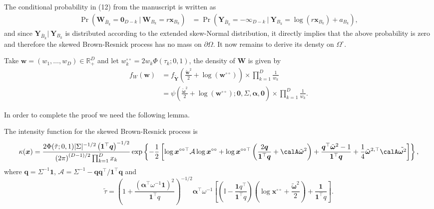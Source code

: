 \documentclass[12pt]{article}
\begin{document}
The conditional probability in (12) from the manuscript is written as
%
\begin{align*}
\Pr(\bm W_{\bar{B}_k} = \bm 0_{D-k} \ | \ \bm W_{B_k} = r \bm x_{B_k} )
& = \Pr(\bm Y_{\bar{B}_k} = - \bm \infty_{D-k} \ | \ \bm Y_{B_k} = \log(r \bm x_{B_k}) + a_{B_k} ),
\end{align*}
and since $\bm Y_{\bar{B}_k}| \ \bm Y_{B_k}$ is distributed according to the extended skew-Normal distribution, it directly implies that the above probability is zero and therefore the skewed Brown-Resnick process has no mass on $\partial\Omega$. It now remains to derive its densty on $\Omega^\circ$.

Take $\bm w = (w_1, \ldots, w_D) \in \mathbb{R}^D_+$ and let $w_k^{\circ\circ} = 2w_k \Phi \left( \tau_k;0,1 \right)$, the density of $\bm W$ is given by
%
\begin{align}
\label{eq:fW_BR}
f_W(\bm w) &= f_{\tilde{\bm Y}} \left( \frac{\tilde{\bm w}^2}{2} + \log\left(\bm w^{\circ\circ}\right) \right) \times \prod_{k=1}^D \frac{1}{w_k} \nonumber \\
&= \psi\left( \frac{\tilde{\bm \omega}^2}{2} + \log\left(\bm w^{\circ\circ}\right); \bm 0, \Sigma, \bm \alpha, \bm 0\right) \times \prod_{k=1}^D \frac{1}{w_k}.
\end{align}
%

In order to complete the proof we need the following lemma.

\begin{lemma}
\label{lem:kappSBR}
The intensity function for the skewed Brown-Resnick process is
$$
\kappa(\bm x) =\frac{2\Phi(\tilde{\tau};0,1)| \Sigma |^{-1/2} \left( \bm 1^\top \bm q\right)^{-1/2}}{\left( 2\pi \right)^{(D-1)/2}\prod_{k=1}^Dx_k}\exp \left\{ -\frac{1}{2} \left[ \log \bm x^{\circ\circ\top} \mathcal{A} \log \bm x^{\circ\circ} + \log \bm x^{\circ\circ\top} \left( \frac{2 \bm q}{\bm 1^\top \bm q}+\calA\tilde{\bm\omega}^2\right) + \frac{\bm q^\top\tilde{\bm \omega}^2 - 1}{\bm 1 ^\top \bm q } + \frac{1}{4}{\tilde{\bm\omega}}^{2,\top}\calA\tilde{\bm\omega^2} \right]\right\},
$$
where $\bm q = \Sigma^{-1} \bm 1$, $\mathcal{A} = \Sigma^{-1} - \bm q \bm q^\top / \bm 1^\top \bm q$ and
%
$$\tilde{\tau}=\left(1 + \frac{\left(\bm\alpha^\top\omega^{-1}\bm 1\right)^2}{\bm 1^\top q}\right)^{-1/2}\bm\alpha^\top\omega^{-1}\left[\left(\mathbb{I} - \frac{\bm 1q^\top}{\bm 1^\top q}\right)\left(\log \bm x^{\circ\circ} + \frac{\tilde{\bm\omega}^2}{2}\right) +  \frac{\bm 1}{\bm 1^\top q} \right].$$
\end{lemma}
\end{document}
